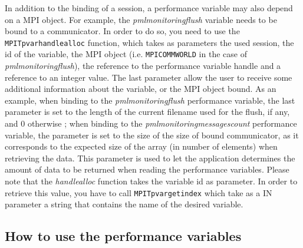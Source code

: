 In addition to the binding of a session, a performance variable may
also depend on a MPI object. For example, the
\textit{pml\brkunds{}monitoring\brkunds{}flush} variable needs to be
bound to a communicator. In order to do so, you need to use the
\texttt{MPI\brkunds{}T\brkunds{}pvar\brkunds{}handle\brkunds{}alloc}
function, which takes as parameters the used session, the id of the
variable, the MPI object
(i.e. \texttt{MPI\brkunds{}COMM\brkunds{}WORLD} in the case of
\textit{pml\brkunds{}monitoring\brkunds{}flush}), the reference to the
performance variable handle and a reference to an integer value. The
last parameter allow the user to receive some additional information
about the variable, or the MPI object bound. As an example, when
binding to the \textit{pml\brkunds{}monitoring\brkunds{}flush}
performance variable, the last parameter is set to the length of the
current filename used for the flush, if any, and 0 otherwise ; when
binding to the
\textit{pml\brkunds{}monitoring\brkunds{}messages\brkunds{}count}
performance variable, the parameter is set to the size of the size of
bound communicator, as it corresponds to the expected size of the
array (in number of elements) when retrieving the data. This parameter
is used to let the application determines the amount of data to be
returned when reading the performance variables. Please note that the
\textit{handle\brkunds{}alloc} function takes the variable id as
parameter. In order to retrieve this value, you have to call
\texttt{MPI\brkunds{}T\brkunds{}pvar\brkunds{}get\brkunds{}index}
which take as a IN parameter a string that contains the name of the
desired variable.

\subsection{How to use the performance variables}

